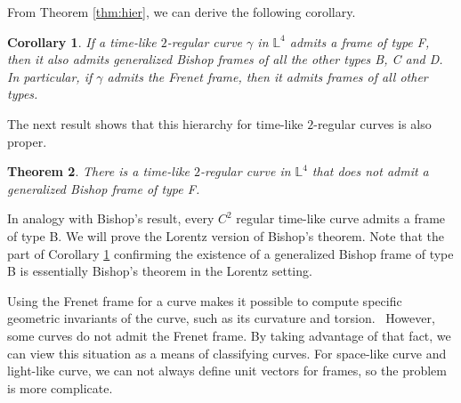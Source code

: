 \documentclass[a4paper]{amsart}
\newtheorem{theorem}{Theorem}[section]
\newtheorem{corollary}[theorem]{Corollary}
\theoremstyle{definition}
\theoremstyle{remark}
\newcommand{\LL}{\mathbb{L}}
\numberwithin{equation}{section}
\begin{document}
From Theorem \ref{thm:hier}, we can derive the following corollary.
\begin{corollary}\label{thm:2reg}
If a time-like $2$-regular curve $\gamma$ in $\LL^{4}$ admits a frame of type F, then it also admits generalized Bishop frames of all the other types B, C and D. In particular, if $\gamma$ admits the Frenet frame, then it admits frames of all other types.
\end{corollary}
The next result shows that this hierarchy for time-like $2$-regular curves is also proper.

\begin{theorem}\label{thm:noF}
There is a time-like $2$-regular curve in $\LL^{4}$ that does not admit a generalized Bishop frame of type F.
\end{theorem}
In analogy with Bishop's result, every $C^{2}$ regular time-like curve admits a frame of type B. We will prove the Lorentz version of Bishop's theorem. Note that the part of Corollary \ref{thm:2reg} confirming the existence of a generalized Bishop frame of type B is essentially Bishop's theorem in the Lorentz setting.

Using the Frenet frame for a curve makes it possible to compute specific geometric invariants of the curve, such as its curvature and torsion.
\ However, some curves do not admit the Frenet frame. By taking advantage of that fact, we can view this situation as a means of classifying curves.
For space-like curve and light-like curve, we can not always define unit vectors for frames, so the problem is more complicate.
\end{document}
